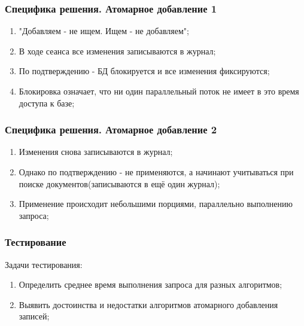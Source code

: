 \documentclass{beamer}
\begin{document}
\begin{frame}\frametitle{Специфика решения. Атомарное добавление 1}
    \begin{enumerate}
        \item "Добавляем - не ищем. Ищем - не добавляем";
        \item В ходе сеанса все изменения записываются в журнал;
        \item По подтверждению - БД блокируется и все изменения фиксируются;
        \item Блокировка означает, что ни один параллельный поток не имеет в это время доступа к базе;
    \end{enumerate}
\end{frame}

\begin{frame}\frametitle{Специфика решения. Атомарное добавление 2}
    \begin{enumerate}
        \item Изменения снова записываются в журнал;
        \item Однако по подтверждению - не применяются, а начинают учитываться при поиске документов(записываются в ещё один журнал); 
        \item Применение происходит небольшими порциями, параллельно выполнению запроса;
    \end{enumerate}
\end{frame}

\begin{frame}\frametitle{Тестирование}
    Задачи тестирования:
    \begin{enumerate}
        \item Определить среднее время выполнения запроса для разных алгоритмов; 
        \item Выявить достоинства и недостатки алгоритмов атомарного добавления записей;
    \end{enumerate}
\end{frame}
\end{document}
